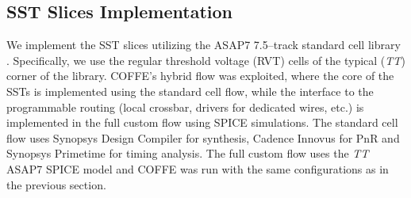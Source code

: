 \subsection{SST Slices Implementation}
\label{subsec:SST_slices_implementation}

We implement the SST slices utilizing the  ASAP7 7.5--track standard cell library \cite{ASAP7_invited_2017, ASAP7_github}.
Specifically, we use the regular threshold voltage (RVT) cells of the typical (\emph{TT}) corner of the library.
COFFE's hybrid flow was exploited, where the core of the SSTs is implemented using the standard cell flow, while the interface to the programmable routing (local crossbar, drivers for dedicated wires, etc.) is implemented in the full custom flow using SPICE simulations.
The standard cell flow uses Synopsys Design Compiler for synthesis, Cadence Innovus for PnR and Synopsys Primetime for timing analysis.
The full custom flow uses the \emph{TT} ASAP7 SPICE model and COFFE was run with the same configurations as in the previous section.



